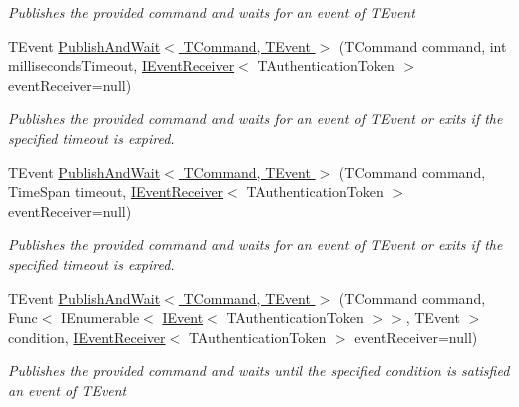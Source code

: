 \begin{DoxyCompactItemize}
\begin{DoxyCompactList}\small\item\em Publishes the provided {\itshape command}  and waits for an event of {\itshape T\+Event}  \end{DoxyCompactList}\item 
T\+Event \hyperlink{classCqrs_1_1Akka_1_1Commands_1_1ConcurrentAkkaCommandPublisher_a4a7273686d0f2af664673b74b71de019_a4a7273686d0f2af664673b74b71de019}{Publish\+And\+Wait$<$ T\+Command, T\+Event $>$} (T\+Command command, int milliseconds\+Timeout, \hyperlink{interfaceCqrs_1_1Events_1_1IEventReceiver}{I\+Event\+Receiver}$<$ T\+Authentication\+Token $>$ event\+Receiver=null)
\begin{DoxyCompactList}\small\item\em Publishes the provided {\itshape command}  and waits for an event of {\itshape T\+Event}  or exits if the specified timeout is expired. \end{DoxyCompactList}\item 
T\+Event \hyperlink{classCqrs_1_1Akka_1_1Commands_1_1ConcurrentAkkaCommandPublisher_a53bb54045aabca54124659e56f8fcede_a53bb54045aabca54124659e56f8fcede}{Publish\+And\+Wait$<$ T\+Command, T\+Event $>$} (T\+Command command, Time\+Span timeout, \hyperlink{interfaceCqrs_1_1Events_1_1IEventReceiver}{I\+Event\+Receiver}$<$ T\+Authentication\+Token $>$ event\+Receiver=null)
\begin{DoxyCompactList}\small\item\em Publishes the provided {\itshape command}  and waits for an event of {\itshape T\+Event}  or exits if the specified timeout is expired. \end{DoxyCompactList}\item 
T\+Event \hyperlink{classCqrs_1_1Akka_1_1Commands_1_1ConcurrentAkkaCommandPublisher_a396d965b3c74f546923840a680539164_a396d965b3c74f546923840a680539164}{Publish\+And\+Wait$<$ T\+Command, T\+Event $>$} (T\+Command command, Func$<$ I\+Enumerable$<$ \hyperlink{interfaceCqrs_1_1Events_1_1IEvent}{I\+Event}$<$ T\+Authentication\+Token $>$$>$, T\+Event $>$ condition, \hyperlink{interfaceCqrs_1_1Events_1_1IEventReceiver}{I\+Event\+Receiver}$<$ T\+Authentication\+Token $>$ event\+Receiver=null)
\begin{DoxyCompactList}\small\item\em Publishes the provided {\itshape command}  and waits until the specified condition is satisfied an event of {\itshape T\+Event}  \end{DoxyCompactList}\item 
$$
\end{DoxyCompactItemize}
